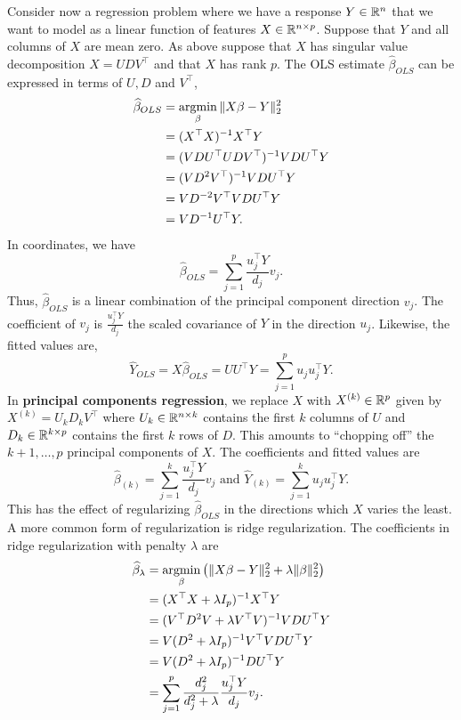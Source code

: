 Consider now a regression problem where we have a response $Y \in \mathbb{R}^n$ that we want to model as a linear function of features $X \in \mathbb{R}^{n \times p}$. Suppose that $Y$ and all columns of $X$ are mean zero. As above suppose that $X$ has singular value decomposition $X=UDV^\top$ and that $X$ has rank $p$. The OLS estimate $\widehat{\beta}_{OLS}$ can be expressed in terms of $U,D$ and $V^\top$,
\begin{align*}
    \widehat{\beta}_{OLS}&=\operatorname*{argmin}_{\beta} \Vert X\beta - Y \Vert_2^2 \\
    &=(X^\top X)^{-1}X^\top Y\\
    &=(VDU^\top U D V^\top)^{-1}V DU^\top Y\\
    &=(VD^2 V^\top)^{-1} VDU^\top Y\\
    &=VD^{-2}V^\top VDU^\top Y\\
    &=VD^{-1}U^\top Y.
\end{align*}
In coordinates, we have
\[\widehat{\beta}_{OLS} = \sum_{j=1}^p \frac{u_j^\top Y}{d_j}v_j. \]
Thus, $\widehat{\beta}_{OLS}$ is a linear combination of the principal component direction $v_j$. The coefficient of $v_j$ is $\frac{u_j^\top Y}{d_j}$ the scaled covariance of $Y$ in the direction $u_j$. Likewise, the fitted values are,
\[\widehat{Y}_{OLS} = X\widehat{\beta}_{OLS} = UU^\top Y =  \sum_{j=1}^p u_ju_j^\top Y. \]
In \textbf{principal components regression}, we replace $X$ with $X^{(k)} \in \mathbb{R}^p$ given by $X^{(k)}= U_k D_k V^\top$ where $U_k \in \mathbb{R}^{n \times k}$ contains the first $k$ columns of $U$ and $D_k \in \mathbb{R}^{k \times p}$ contains the first $k$ rows of $D$. This amounts to ``chopping off'' the $k+1,\ldots,p$ principal components of $X$. The coefficients and fitted values are 
\[\widehat{\beta}_{(k)} = \sum_{j=1}^k \frac{u_j^\top Y}{d_j} v_j \text{ and } \widehat{Y}_{(k)} = \sum_{j=1}^k u_ju_j^\top Y. \]
This has the effect of regularizing $\widehat{\beta}_{OLS}$ in the directions which $X$ varies the least. A more common form of regularization is ridge regularization. The coefficients in ridge regularization with penalty $\lambda$ are
\begin{align*}
    \widehat{\beta}_\lambda&=\operatorname*{argmin}_\beta \left(\Vert X \beta - Y \Vert_2^2 + \lambda \Vert \beta\Vert_2^2 \right)\\
    &=(X^\top X + \lambda I_p)^{-1}X^\top Y\\
    &=(V^\top D^2 V + \lambda V^\top V)^{-1}VDU^\top Y\\
    &=V (D^2+\lambda I_p)^{-1}V^\top VDU^\top Y\\
    &= V(D^2 + \lambda I_p)^{-1} DU^\top Y\\
    &=\sum_{j=1}^p \frac{d_j^2}{d_j^2+\lambda} \frac{u_j^\top Y}{d_j}v_j.
\end{align*}
